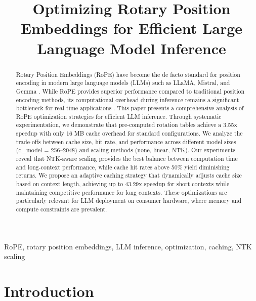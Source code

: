 \documentclass[conference]{IEEEtran}
\begin{document}
\title{Optimizing Rotary Position Embeddings for Efficient Large Language Model Inference}

\author{
}

\maketitle

\begin{abstract}
Rotary Position Embeddings (RoPE) have become the de facto standard for position encoding in modern large language models (LLMs) such as LLaMA, Mistral, and Gemma \cite{su2021}. While RoPE provides superior performance compared to traditional position encoding methods, its computational overhead during inference remains a significant bottleneck for real-time applications \cite{chen2024}. This paper presents a comprehensive analysis of RoPE optimization strategies for efficient LLM inference. Through systematic experimentation, we demonstrate that pre-computed rotation tables achieve a 3.55x speedup with only 16 MB cache overhead for standard configurations. We analyze the trade-offs between cache size, hit rate, and performance across different model sizes (d\_model = 256--2048) and scaling methods (none, linear, NTK). Our experiments reveal that NTK-aware scaling provides the best balance between computation time and long-context performance, while cache hit rates above 50\% yield diminishing returns. We propose an adaptive caching strategy that dynamically adjusts cache size based on context length, achieving up to 43.29x speedup for short contexts while maintaining competitive performance for long contexts. These optimizations are particularly relevant for LLM deployment on consumer hardware, where memory and compute constraints are prevalent.

\end{abstract}

\begin{IEEEkeywords}
RoPE, rotary position embeddings, LLM inference, optimization, caching, NTK scaling
\end{IEEEkeywords}

\section{Introduction}
\end{document}
